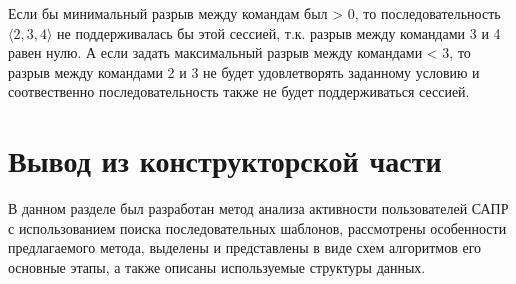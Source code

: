 Если бы минимальный разрыв между командам был > 0, то последовательность $\langle2,3,4\rangle$ не поддерживалась бы этой сессией, т.к. разрыв между командами 3 и 4 равен нулю. А если задать максимальный разрыв между командами < 3, то разрыв между командами 2 и 3 не  будет удовлетворять заданному условию и соотвественно последовательность также не будет поддерживаться сессией.

\section*{Вывод из конструкторской части}
В данном разделе был разработан метод анализа активности пользователей САПР с использованием поиска последовательных шаблонов, рассмотрены особенности предлагаемого метода, выделены и представлены в виде схем алгоритмов его основные этапы, а также описаны используемые структуры данных.